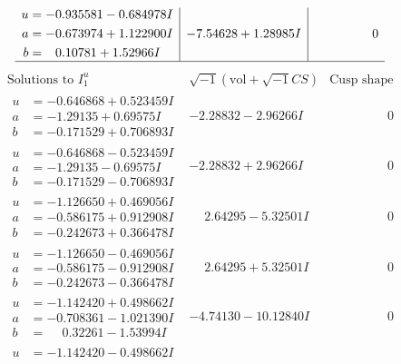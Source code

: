 \documentclass[1p]{elsarticle_modified}
\theoremstyle{definition}
\newcommand{\I}{\sqrt{-1}}
\begin{document}
$$\begin{array}{c|c|c}
\begin{aligned}
u &= -0.935581 - 0.684978 I \\
a &= -0.673974 + 1.122900 I \\
b &= \phantom{-}0.10781 + 1.52966 I\end{aligned}
 & -7.54628 + 1.28985 I & \phantom{-0.000000 } 0\\
 \hline 
 \end{array}$$\newpage$$\begin{array}{c|c|c}  
\text{Solutions to }I^u_{1}& \I (\text{vol} + \sqrt{-1}CS) & \text{Cusp shape}\\
 \hline 
\begin{aligned}
u &= -0.646868 + 0.523459 I \\
a &= -1.29135 + 0.69575 I \\
b &= -0.171529 + 0.706893 I\end{aligned}
 & -2.28832 - 2.96266 I & \phantom{-0.000000 } 0 \\ \hline\begin{aligned}
u &= -0.646868 - 0.523459 I \\
a &= -1.29135 - 0.69575 I \\
b &= -0.171529 - 0.706893 I\end{aligned}
 & -2.28832 + 2.96266 I & \phantom{-0.000000 } 0 \\ \hline\begin{aligned}
u &= -1.126650 + 0.469056 I \\
a &= -0.586175 + 0.912908 I \\
b &= -0.242673 + 0.366478 I\end{aligned}
 & \phantom{-}2.64295 - 5.32501 I & \phantom{-0.000000 } 0 \\ \hline\begin{aligned}
u &= -1.126650 - 0.469056 I \\
a &= -0.586175 - 0.912908 I \\
b &= -0.242673 - 0.366478 I\end{aligned}
 & \phantom{-}2.64295 + 5.32501 I & \phantom{-0.000000 } 0 \\ \hline\begin{aligned}
u &= -1.142420 + 0.498662 I \\
a &= -0.708361 - 1.021390 I \\
b &= \phantom{-}0.32261 - 1.53994 I\end{aligned}
 & -4.74130 - 10.12840 I & \phantom{-0.000000 } 0 \\ \hline\begin{aligned}
u &= -1.142420 - 0.498662 I \\

\end{aligned}
\end{array}$$
\end{document}
